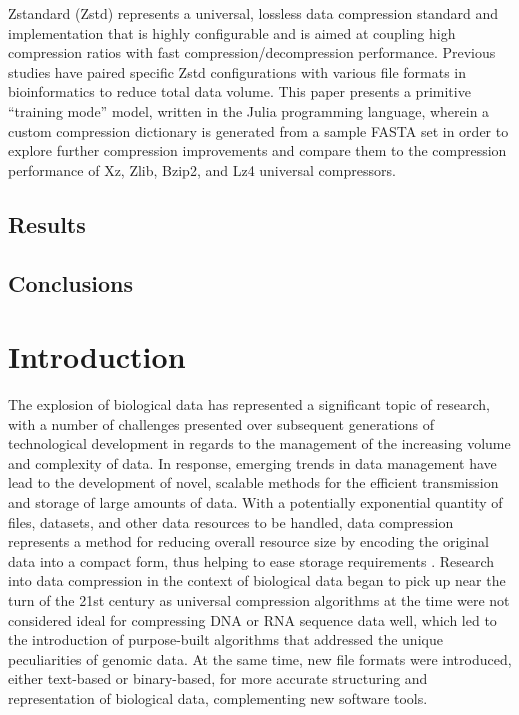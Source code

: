 \documentclass[
  10pt,
  letterpaper,
]{article}
\begin{document}
Zstandard (Zstd) represents a universal, lossless data compression
standard and implementation that is highly configurable and is aimed at
coupling high compression ratios with fast compression/decompression
performance. Previous studies have paired specific Zstd configurations
with various file formats in bioinformatics to reduce total data volume.
This paper presents a primitive ``training mode'' model, written in the
Julia programming language, wherein a custom compression dictionary is
generated from a sample FASTA set in order to explore further
compression improvements and compare them to the compression performance
of Xz, Zlib, Bzip2, and Lz4 universal compressors.

\hypertarget{results}{%
\subsection{Results}\label{results}}

\hypertarget{conclusions}{%
\subsection{Conclusions}\label{conclusions}}


\linenumbers\hypertarget{introduction}{%
\section{Introduction}\label{introduction}}

The explosion of biological data has represented a significant topic of
research, with a number of challenges presented over subsequent
generations of technological development in regards to the management of
the increasing volume and complexity of
data\citep{d2018high, li2014big}. In response, emerging trends in data
management have lead to the development of novel, scalable methods for
the efficient transmission and storage of large amounts of
data\citep{sais2022intelligent}. With a potentially exponential quantity
of files, datasets, and other data resources to be handled, data
compression represents a method for reducing overall resource size by
encoding the original data into a compact form, thus helping to ease
storage requirements \citep{jayasankar2021survey}. Research into data
compression in the context of biological data began to pick up near the
turn of the 21st century as universal compression algorithms at the time
were not considered ideal for compressing DNA or RNA sequence data well,
which led to the introduction of purpose-built algorithms that addressed
the unique peculiarities of genomic data\citep{grumbach1994new}. At the
same time, new file formats were introduced, either text-based or
binary-based, for more accurate structuring and representation of
biological data, complementing new software
tools\citep{lipman1985rapid, mills2014common}.
\end{document}
